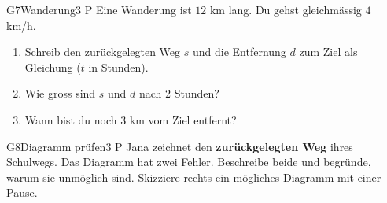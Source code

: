 \documentclass[11pt]{article}
\begin{document}

\begin{lpaufgabe}{G7}{Wanderung}{3 P}
Eine Wanderung ist $12$ km lang. Du gehst gleichmässig $4$ km/h.
\begin{enumerate}[label=(\alph*),leftmargin=*,itemsep=3pt]
\item Schreib den zurückgelegten Weg $s$ und die Entfernung $d$ zum Ziel als Gleichung ($t$ in Stunden).
\item Wie gross sind $s$ und $d$ nach $2$ Stunden?
\item Wann bist du noch $3$ km vom Ziel entfernt?
\end{enumerate}
\end{lpaufgabe}

\begin{lpaufgabe}{G8}{Diagramm prüfen}{3 P}
Jana zeichnet den \textbf{zurückgelegten Weg} ihres Schulwegs. Das Diagramm hat zwei Fehler. Beschreibe beide und begründe, warum sie unmöglich sind.
Skizziere rechts ein mögliches Diagramm mit einer Pause.
\begin{center}
\hfill
{}
\end{center}
\end{lpaufgabe}
\end{document}

